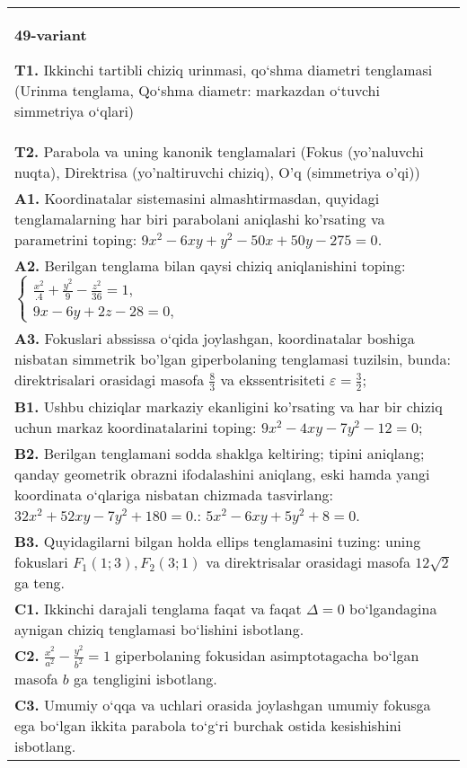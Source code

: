 \documentclass{article}
\begin{document}
\begin{tabular}{m{17cm}}
\textbf{49-variant}
\newline

\textbf{T1.} Ikkinchi tartibli chiziq urinmasi, qo‘shma diametri tenglamasi (Urinma tenglama, Qo‘shma diametr: markazdan o‘tuvchi simmetriya o‘qlari) \\
\textbf{T2.} Parabola va uning kanonik tenglamalari (Fokus (yo’naluvchi nuqta), Direktrisa (yo’naltiruvchi chiziq), O’q (simmetriya o’qi)) \\
\textbf{A1.} Koordinatalar sistemasini almashtirmasdan, quyidagi tenglamalarning har biri parabolani aniqlashi ko'rsating va parametrini toping: $9 x^2-6 x y+y^2-50 x+50 y-275=0$. \\
\textbf{A2.} Berilgan tenglama bilan qaysi chiziq aniqlanishini toping: $\left\{\begin{array}{l}\frac{x^2}{.4}+\frac{y^2}{9}-\frac{z^2}{36}=1, \\ 9 x-6 y+2 z-28=0,\end{array}\right.$ \\
\textbf{A3.} Fokuslari abssissa o‘qida joylashgan, koordinatalar boshiga nisbatan simmetrik bo'lgan giperbolaning tenglamasi tuzilsin, bunda: direktrisalari orasidagi masofa $\frac{8}{3}$ va ekssentrisiteti $\varepsilon=\frac{3}{2}$; \\
\textbf{B1.} Ushbu chiziqlar markaziy ekanligini ko'rsating va har bir chiziq uchun markaz koordinatalarini toping: $9 x^2-4 x y-7 y^2-12=0$; \\
\textbf{B2.} Berilgan tenglamani sodda shaklga keltiring; tipini aniqlang; qanday geometrik obrazni ifodalashini aniqlang, eski hamda yangi koordinata o‘qlariga nisbatan chizmada tasvirlang: $32x^2+52xy-7y^2+180=0$.: $5 x^2-6 x y+5 y^2+8=0$. \\
\textbf{B3.} Quyidagilarni bilgan holda ellips tenglamasini tuzing: uning fokuslari $F_1 (1; 3), F_2 (3; 1) $ va direktrisalar orasidagi masofa $12 \sqrt{2}$ ga teng. \\
\textbf{C1.} Ikkinchi darajali tenglama faqat va faqat $\Delta=0$ bo‘lgandagina aynigan chiziq tenglamasi bo‘lishini isbotlang. \\
\textbf{C2.} $\frac{x^2}{a^2}-\frac{y^2}{b^2}=1$ giperbolaning fokusidan asimptotagacha bo‘lgan masofa $b$ ga tengligini isbotlang. \\
\textbf{C3.} Umumiy o‘qqa va uchlari orasida joylashgan umumiy fokusga ega bo‘lgan ikkita parabola to‘g‘ri burchak ostida kesishishini isbotlang. \\

\end{tabular}
\vspace{1cm}
\end{document}
